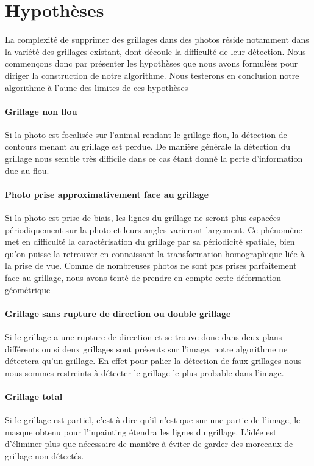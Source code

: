 \section{Hypothèses}
La complexité de supprimer des grillages dans des photos réside notamment dans la variété des grillages existant, dont découle la difficulté de leur détection. Nous commençons donc par présenter les hypothèses que nous avons formulées pour diriger la construction de notre algorithme. Nous testerons en conclusion notre algorithme à l'aune des limites de ces hypothèses

\paragraph{Grillage non flou} Si la photo est focalisée sur l'animal rendant le grillage flou, la détection de contours menant au grillage est perdue. De manière générale la détection du grillage nous semble très difficile dans ce cas étant donné la perte d'information due au flou.

\paragraph{Photo prise approximativement face au grillage}
Si la photo est prise de biais, les lignes du grillage ne seront plus espacées périodiquement sur la photo et leurs angles varieront largement. Ce phénomène met en difficulté la caractérisation du grillage par sa périodicité spatiale, bien qu'on puisse la retrouver en connaissant la transformation homographique liée à la prise de vue. Comme de nombreuses photos ne sont pas prises parfaitement face au grillage, nous avons tenté de prendre en compte cette déformation géométrique

\paragraph{Grillage sans rupture de direction ou double grillage}
Si le grillage a une rupture de direction et se trouve donc dans deux plans différents ou si deux grillages sont présents sur l'image, notre algorithme ne détectera qu'un grillage. En effet pour palier la détection de faux grillages nous nous sommes restreints à détecter le grillage le plus probable dans l'image.

\paragraph{Grillage total}
Si le grillage est partiel, c'est à dire qu'il n'est que sur une partie de l'image, le masque obtenu pour l'inpainting étendra les lignes du grillage. L'idée est d'éliminer plus que nécessaire de manière à éviter de garder des morceaux de grillage non détectés.

